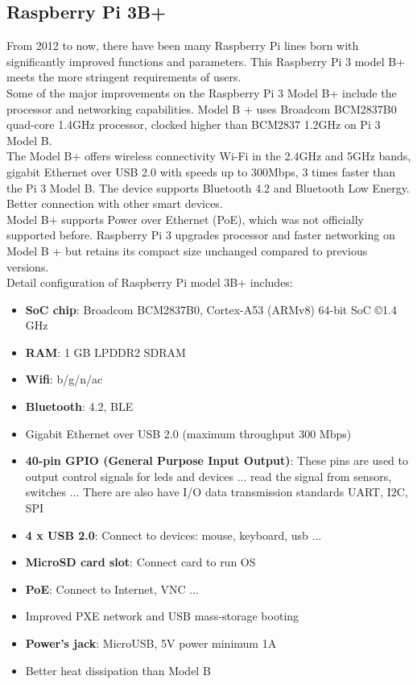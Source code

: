     \subsection{Raspberry Pi 3B+}
        From 2012 to now, there have been many Raspberry Pi lines born with significantly improved functions and parameters. This Raspberry Pi 3 model B+ meets the more stringent requirements of users. \\ 
        \vspace{3mm}
        Some of the major improvements on the Raspberry Pi 3 Model B+ include the processor and networking capabilities. Model B + uses Broadcom BCM2837B0 quad-core 1.4GHz processor, clocked higher than BCM2837 1.2GHz on Pi 3 Model B. \\ 
        \vspace{3mm}
        The Model B+ offers wireless connectivity Wi-Fi in the 2.4GHz and 5GHz bands, gigabit Ethernet over USB 2.0 with speeds up to 300Mbps, 3 times faster than the Pi 3 Model B. The device supports Bluetooth 4.2 and Bluetooth Low Energy. 
        Better connection with other smart devices. \\ 
        \vspace{3mm}
        Model B+ supports Power over Ethernet (PoE), which was not officially supported before. Raspberry Pi 3 upgrades processor and faster networking on Model B + but retains its compact size unchanged compared to previous versions. \\
        \vspace{3mm}
        Detail configuration of Raspberry Pi model 3B+ includes: 
        \begin{itemize}
            \item \textbf{SoC chip}: Broadcom BCM2837B0, Cortex-A53 (ARMv8) 64-bit SoC \copyright 1.4 GHz
            \item \textbf{RAM}: 1 GB LPDDR2 SDRAM
            \item \textbf{Wifi}: b/g/n/ac
            \item \textbf{Bluetooth}: 4.2, BLE
            \item Gigabit Ethernet over USB 2.0 (maximum throughput 300 Mbps)
            \item \textbf{40-pin GPIO (General Purpose Input Output)}: These pins are used to output control signals for leds and devices ... read the signal from sensors, switches ... There are also have I/O data transmission standards UART, 
            I2C, SPI
            \item \textbf{4 x USB 2.0}: Connect to devices: mouse, keyboard, usb ... 
            \item \textbf{MicroSD card slot}: Connect card to run OS
            \item \textbf{PoE}: Connect to Internet, VNC ... 
            \item Improved PXE network and USB mass-storage booting
            \item \textbf{Power's jack}: MicroUSB, 5V power minimum 1A
            \item Better heat dissipation than Model B
        \end{itemize}
